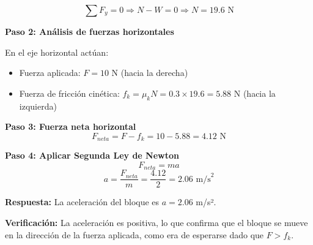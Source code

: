 \begin{ejercicio}
\begin{solucion}
$$\sum F_y = 0 \Rightarrow N - W = 0 \Rightarrow N = 19.6 \text{ N}$$

\textbf{Paso 2: Análisis de fuerzas horizontales}

En el eje horizontal actúan:
\begin{itemize}
\item Fuerza aplicada: $F = 10$ N (hacia la derecha)
\item Fuerza de fricción cinética: $f_k = \mu_k N = 0.3 \times 19.6 = 5.88$ N (hacia la izquierda)
\end{itemize}

\textbf{Paso 3: Fuerza neta horizontal}
$$F_{neta} = F - f_k = 10 - 5.88 = 4.12 \text{ N}$$

\textbf{Paso 4: Aplicar Segunda Ley de Newton}
$$F_{neta} = ma$$
$$a = \frac{F_{neta}}{m} = \frac{4.12}{2} = 2.06 \text{ m/s}^2$$

\textbf{Respuesta:} La aceleración del bloque es $a = 2.06$ m/s².

\textbf{Verificación:} La aceleración es positiva, lo que confirma que el bloque se mueve en la dirección de la fuerza aplicada, como era de esperarse dado que $F > f_k$.
\end{solucion}
\end{ejercicio}
